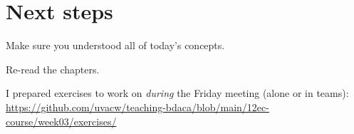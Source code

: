 \documentclass[compress]{beamer}
\begin{document}
\section{Next steps}

\begin{frame}[standout]
Make sure you understood all of today's concepts.

Re-read the chapters.

I prepared exercises to work on \emph{during} the Friday meeting (alone or in teams):
\large{\url{https://github.com/uvacw/teaching-bdaca/blob/main/12ec-course/week03/exercises/}}
\end{frame}





\begin{frame}
	\printbibliography
\end{frame}
\end{document}
